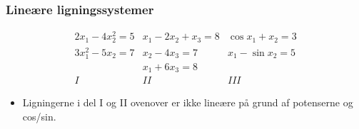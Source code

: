 \documentclass[a4wide,10pt]{article}
\begin{document}
\subsubsection{Lineære ligningssystemer} %
\label{ssub:lineaere_ligningssystemer}
\[\begin{array}{*{20}{c}}
{2{x_1} - 4x_2^2 = 5}&{{x_1} - 2{x_2} + {x_3} = 8}&{\cos {x_1} + {x_2} = 3}\\
{3x_1^2 - 5{x_2} = 7}&{{x_2} - 4{x_3} = 7}&{{x_1} - \sin {x_2} = 5}\\
{}&{{x_1} + 6{x_3} = 8}&{}\\
I&{II}&{III}
\end{array}\]
\begin{itemize}
	\item Ligningerne i del I og II ovenover er ikke lineære på grund af potenserne og cos/sin.
\end{itemize}
\end{document}
